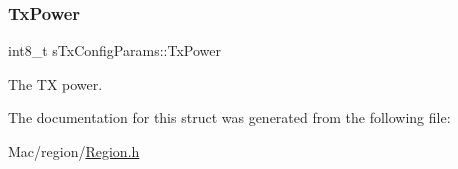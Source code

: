 \subsubsection{\texorpdfstring{Tx\+Power}{TxPower}}
{\footnotesize\ttfamily int8\+\_\+t s\+Tx\+Config\+Params\+::\+Tx\+Power}

The TX power. 

The documentation for this struct was generated from the following file\+:\begin{DoxyCompactItemize}
\item 
Mac/region/\hyperlink{Region_8h}{Region.\+h}\end{DoxyCompactItemize}
